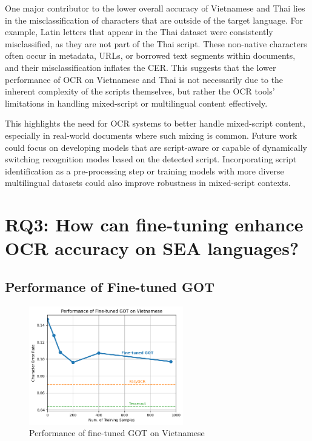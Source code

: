 \documentclass[12pt,oneside]{memoir}
\begin{document}
One major contributor to the lower overall accuracy of Vietnamese and Thai lies in the misclassification of characters that are outside of the target language. 
For example, Latin letters that appear in the Thai dataset were consistently misclassified, as they are not part of the Thai script.
These non-native characters often occur in metadata, URLs, or borrowed text segments within documents, and their misclassification inflates the CER. 
This suggests that the lower performance of OCR on Vietnamese and Thai is not necessarily due to the inherent complexity of the scripts themselves, but rather the OCR tools’ limitations in handling mixed-script or multilingual content effectively.

This highlights the need for OCR systems to better handle mixed-script content, especially in real-world documents where such mixing is common. Future work could focus on developing models that are script-aware or capable of dynamically switching recognition modes based on the detected script. Incorporating script identification as a pre-processing step or training models with more diverse multilingual datasets could also improve robustness in mixed-script contexts.

\section{RQ3: How can fine-tuning enhance OCR accuracy on SEA languages?}

\subsection{Performance of Fine-tuned GOT}

\begin{figure}[ht]
    \centering
    \includegraphics[width=0.6\textwidth]{images/fine-tuned-got-vietnamese.png}
    \caption{Performance of fine-tuned GOT on Vietnamese}
    \label{figure:fine-tuned-got-vietnamese}
\end{figure}
\end{document}
